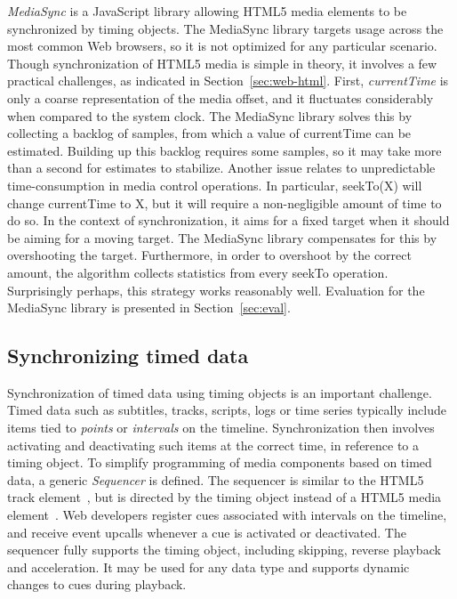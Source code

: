 \documentclass[graybox]{svmult}
\begin{document}
\emph{MediaSync} is a JavaScript library allowing HTML5 media elements to be
synchronized by timing objects. The MediaSync library targets usage across the
most common Web browsers, so it is not optimized for any particular scenario.
Though synchronization of HTML5 media is simple in theory, it involves a few
practical challenges, as indicated in Section~\ref{sec:web-html}. First,
\emph{currentTime} is only a coarse representation of the media offset, and it
fluctuates considerably when compared to the system clock. The MediaSync
library solves this by collecting a backlog of samples, from which a value of
currentTime can be estimated. Building up this backlog requires some samples,
so it may take more than a second for estimates to stabilize. Another issue
relates to unpredictable time-consumption in media control operations. In
particular, seekTo(X) will change currentTime to X, but it will require a non-negligible 
amount of time to do so. In the context of synchronization, it aims
for a fixed target when it should be aiming for a moving target. The MediaSync
library compensates for this by overshooting the target. Furthermore, in order
to overshoot by the correct amount, the algorithm collects statistics from
every seekTo operation. Surprisingly perhaps, this strategy works reasonably
well. Evaluation for the MediaSync library is presented in Section~\ref{sec:eval}.


\subsection{Synchronizing timed data}
\label{sec:sequencer}

Synchronization of timed data using timing objects is an important challenge.
Timed data such as subtitles, tracks, scripts, logs or time series typically
include items tied to \emph{points} or \emph{intervals} on the timeline.
Synchronization then involves activating and deactivating such items at the
correct time, in reference to a timing object. To simplify programming of
media components based on timed data, a generic \emph{Sequencer} is defined.
The sequencer is similar to the HTML5 track element~\cite{html5track}, but is
directed by the timing object instead of a HTML5 media
element~\cite{html5media}. Web developers register cues associated with
intervals on the timeline, and receive event upcalls whenever a cue is
activated or deactivated. The sequencer fully supports the timing object,
including skipping, reverse playback and acceleration. It may be used for any
data type and supports dynamic changes to cues during playback.
\end{document}
